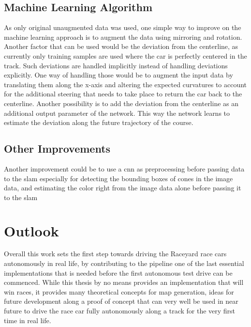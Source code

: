 \subsection{Machine Learning Algorithm}
As  only original unaugmented data was used, one simple way to improve on the machine learning approach is to augment the data using mirroring and rotation. Another factor that can be used would be the deviation from the centerline, as currently only training samples are used where the car is perfectly centered in the track. Such deviations are handled implicitly instead of handling deviations explicitly. One way of handling those would be to augment the input data by translating them along the x-axis and altering the expected curvatures to account for the additional steering that needs to take place to return the car back to the centerline. Another possibility is to add the deviation from the centerline as an additional output parameter of the network. This way the network learns to estimate the deviation along the future trajectory of the course.
\subsection{Other Improvements}
Another improvement could be to use a \ac{cnn} as preprocessing before passing data to the \ac{slam} especially for detecting the bounding boxes of cones in the image data, and estimating the color right from the image data alone before passing it to the slam
\section{Outlook}
Overall this work sets the first step towards driving the Raceyard race cars autonomously in real life, by contributing to the pipeline one of the last essential implementations that is needed before the first autonomous test drive can be commenced. While this thesis by no means provides an implementation that will win races, it provides many theoretical concepts for map generation, ideas for future development along a proof of concept that can very well be used in near future to drive the race car fully autonomously along a track for the very first time in real life.
